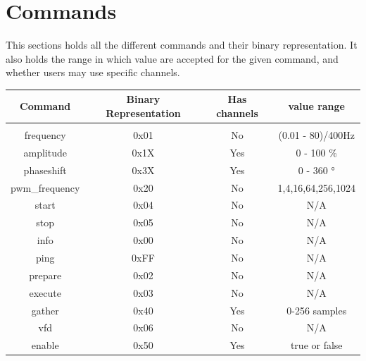 \documentclass{article}
\begin{document}
\section{Commands}
\label{sec:Commands}
This sections holds all the different commands and their binary representation.
It also holds the range in which value are accepted for the given command, and whether
users may use specific channels.\newline
\begin{tabular}{c c c c}
	\hline
	Command & Binary Representation & Has channels & value range\\
	\hline \hline \\
	frequency & 0x01 & No & (0.01 - 80)/400\si{\hertz}\\
	amplitude & 0x1X & Yes & 0 - 100 \si{\percent}\\
	phaseshift & 0x3X & Yes & 0 - 360 \si{\degree}\\
	pwm\_frequency & 0x20 & No & 1,4,16,64,256,1024 \\
	start & 0x04 & No & N/A \\
	stop & 0x05 & No & N/A \\
	info & 0x00 & No & N/A \\
	ping & 0xFF & No & N/A \\
	prepare & 0x02 & No & N/A \\
	execute & 0x03 & No & N/A \\
	gather & 0x40 & Yes & 0-256 samples \\
	vfd & 0x06 & No & N/A \\
	enable & 0x50 & Yes & true or false \\
	\hline
\end{tabular}
\end{document}
